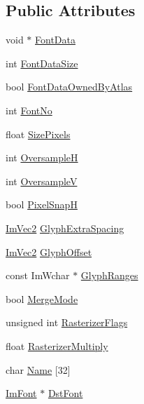 \subsection*{Public Attributes}
\begin{DoxyCompactItemize}
\item 
void $\ast$ \hyperlink{struct_im_font_config_a0265861de7ba7b0d953e1c97e7a50cf3}{Font\+Data}
\item 
int \hyperlink{struct_im_font_config_a39df7ad3bb496421ce2cc5d2428345ef}{Font\+Data\+Size}
\item 
bool \hyperlink{struct_im_font_config_a99dfbf61ef79cee89b6f03e17cbe63b4}{Font\+Data\+Owned\+By\+Atlas}
\item 
int \hyperlink{struct_im_font_config_ab37ee3d5cf76000a4000e9296161e527}{Font\+No}
\item 
float \hyperlink{struct_im_font_config_a2eff9cc7a11461414402f08ab910d277}{Size\+Pixels}
\item 
int \hyperlink{struct_im_font_config_ab460df0d8019ffa8d124e8988c710910}{OversampleH}
\item 
int \hyperlink{struct_im_font_config_a8018f84c60bfafb2b4629aeb77a047cb}{OversampleV}
\item 
bool \hyperlink{struct_im_font_config_a635b5fa03934467891fa949a037b5b89}{Pixel\+SnapH}
\item 
\hyperlink{struct_im_vec2}{Im\+Vec2} \hyperlink{struct_im_font_config_a82db103689b1c434ec92875721967c07}{Glyph\+Extra\+Spacing}
\item 
\hyperlink{struct_im_vec2}{Im\+Vec2} \hyperlink{struct_im_font_config_a290a81956fdcb7ad3b5e3152594db121}{Glyph\+Offset}
\item 
const Im\+Wchar $\ast$ \hyperlink{struct_im_font_config_aa174ceff80323012cd1b717d864258dd}{Glyph\+Ranges}
\item 
bool \hyperlink{struct_im_font_config_ad5cab281622e5bdec8e2d55cadc5601e}{Merge\+Mode}
\item 
unsigned int \hyperlink{struct_im_font_config_a80d05eea7733731a3e9ac1d9e905e5b3}{Rasterizer\+Flags}
\item 
float \hyperlink{struct_im_font_config_a9365265cc52098a8ecf89ff47f6106f2}{Rasterizer\+Multiply}
\item 
char \hyperlink{struct_im_font_config_abcd5db10139b42fbac90e31512c64f08}{Name} \mbox{[}32\mbox{]}
\item 
\hyperlink{struct_im_font}{Im\+Font} $\ast$ \hyperlink{struct_im_font_config_a561773c311f6cf6de00642c2801e7b92}{Dst\+Font}
\end{DoxyCompactItemize}


